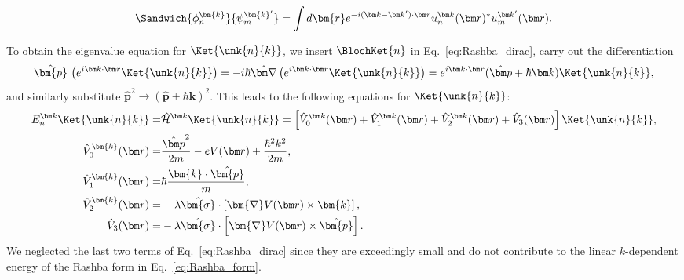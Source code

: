 \begin{equation}
	\Sandwich{\phi_n^{\bm{k}}}{\psi_m^{\bm{k}'}} = \int d\bm{r} e^{-i (\bm k - \bm k') \cdot \bm r} u_n^{\bm k }(\bm r)^* u_m^{\bm k'}(\bm r).
\end{equation}

To obtain the eigenvalue equation for $\Ket{\unk{n}{k}}$, we insert $\BlochKet{n}$ in Eq.~\eqref{eq:Rashba_dirac}, carry out the differentiation
\begin{equation}
	\label{eq:Rashba_momentum}
\hat{\bm{p}} \, \left(\Eikr\Ket{\unk{n}{k}}\right) = -i \hbar \hat{\bm \nabla}\left( \Eikr\Ket{\unk{n}{k}}\right) = \Eikr(\hat{\bm p} + \hbar \bm k)\Ket{\unk{n}{k}},
\end{equation}
and similarly substitute $\hat{\bm{p}}^2 \rightarrow (\hat{\bm{p}}+\hbar \bm{k})^2$.
This leads to the following equations for $\Ket{\unk{n}{k}}$:
\begin{align}
	\label{eq:Rashba_unk_Vs}
	E_n^{\bm k} \Ket{\unk{n}{k}} =& \hat{\mathcal H}^{\bm k}\Ket{\unk{n}{k}} = \left[\hat{V}^{\bm k}_0(\bm r) + \hat{V}^{\bm k}_1(\bm r)  +  \hat{V}^{\bm k}_2(\bm r) + \hat{V}_3(\bm r) \right] \Ket{\unk{n}{k}}, \\
	\hat{V}_0^{\bm{k}}(\bm r) =& \frac{\hat{\bm p}^2}{2m} - eV(\bm r) + \frac{\hbar^2 k^2}{2m}, \\
	\hat{V}_1^{\bm{k}}(\bm r) =& \hbar\frac{\bm{k}\cdot\hat{\bm{p}}}{m}, \\
	\hat{V}_2^{\bm{k}}(\bm r) =& -\lambda \hat{\bm{\sigma}} \cdot \left[ \bm{\nabla}V(\bm r) \times \bm{k}\right], \\
	\hat{V}_3(\bm r) =& -\lambda \hat{\bm{\sigma}} \cdot \left[ \bm{\nabla}V(\bm r) \times \hat{\bm{p}}\right].
\end{align}
We neglected the last two terms of Eq.~\eqref{eq:Rashba_dirac} since they are exceedingly small and do not contribute to the linear $k$-dependent energy of the Rashba form in Eq.~\eqref{eq:Rashba_form}.

